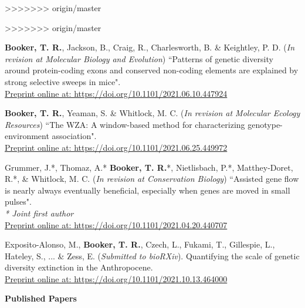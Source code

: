 \documentclass[11pt]{article}
\makeatletter
\newlength{\bibhang}
\newlength{\bibsep}
 {\@listi \global\bibsep\itemsep \global\advance\bibsep by\parsep}
\newenvironment{bibsection}%
        {\begin{etaremune}{}{%
       \setlength{\leftmargin}{\bibhang}%
       \setlength{\itemindent}{-\leftmargin}%
       \setlength{\itemsep}{\bibsep}%
       \setlength{\parsep}{\z@}%
        \setlength{\partopsep}{0pt}%
        \setlength{\topsep}{0pt}}}
        {\end{etaremune}\vspace{-.6\baselineskip}}
\makeatother
\begin{document}
>>>>>>> origin/master
\begin{bibsection}
>>>>>>> origin/master

    \item[] {\bf Booker, T. R.}, Jackson, B., Craig, R., Charlesworth, B. \& Keightley, P. D. (\textit{In revision at Molecular Biology and Evolution}) ``Patterns of genetic diversity around protein-coding exons and conserved non-coding elements are explained by strong selective sweeps in mice".  \\\href{https://www.biorxiv.org/content/10.1101/2021.06.10.447924v2}{Preprint online at: https://doi.org/10.1101/2021.06.10.447924}

    \item[] {\bf Booker, T. R.}, Yeaman, S. \& Whitlock, M. C.   (\textit{In revision at Molecular Ecology Resources}) ``The WZA: A window-based method for characterizing genotype-environment association".  \\\href{https://www.biorxiv.org/content/10.1101/2021.06.25.449972v1}{Preprint online at: https://doi.org/10.1101/2021.06.25.449972}

    \item[] Grummer, J.*, Thomaz, A.* {\bf Booker, T. R.}*, Nietlisbach, P.*, Matthey-Doret, R.*, \& Whitlock, M. C.  (\textit{In revision at Conservation Biology}) ``Assisted gene flow is nearly always eventually beneficial, especially when genes are moved in small pulses". \\ \emph{* Joint first author}  \\\href{https://www.biorxiv.org/content/10.1101/2021.04.20.440707v1}{Preprint online at: https://doi.org/10.1101/2021.04.20.440707}

	\item[] Exposito-Alonso, M., {\bf Booker, T. R.}, Czech, L., Fukami, T., Gillespie, L., Hateley, S., ... \& Zess, E. (\textit{Submitted to bioRXiv}). Quantifying the scale of genetic diversity extinction in the Anthropocene. \\\href{https://www.biorxiv.org/content/10.1101/2021.10.13.464000v1}{Preprint online at: https://doi.org/10.1101/2021.10.13.464000}
\end{bibsection}

\vspace{.1275in}
\textbf{Published Papers}
\end{document}
